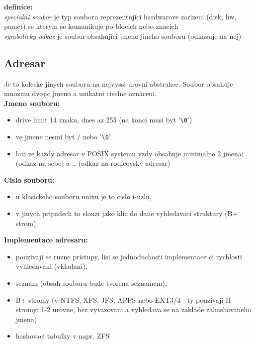 \documentclass[a4paper, 11pt]{article}
\begin{document}
\textbf{definice:} \\[0.5em]
\textit{specialni soubor} je typ souboru reprezentujici hardwarove zarizeni (disk, hw, pamet) se kterym se komunikuje po blocich nebo znacich \\[0.2em]
\textit{symbolicky odkaz} je soubor obsahujici jmeno jineho souboru (odkazuje na nej) \\

\newpage

\subsection{Adresar}
Je to kolecke jinych souboru na nejvyssi urovni abstrakce. Soubor obsahuje mnozinu dvojic jmeno a unikatni ciselne oznaceni. \\

\textbf{Jmeno souboru:}
\begin{itemize}
    \item drive limit 14 znaku, dnes az 255 (na konci musi byt '\verb|\0|')
    \item ve jmene nesmi byt / nebo '\verb|\0|' \\
    \item lati ze kazdy adresar v POSIX systemu vzdy obsahuje minimalne 2 jmena: . (odkaz na sebe) a .. (odkaz na rodicovsky adresar)
\end{itemize}

\textbf{Cislo souboru:}
\begin{itemize}
    \item u klasickeho souboru unixu je to cislo i-uzlu,
    \item v jinych pripadech to slouzi jako klic do dane vyhledavaci struktury (B+ strom)
\end{itemize}

\textbf{Implementace adresaru:}
\begin{itemize}
    \item pouzivaji se ruzne pristupy, lisi se jednoduchosti implementace ci rychlosti vyhledavani (vkladani),
    \item seznam (obsah souboru bude tvorena seznamem),
    \item B+ stromy (v NTFS, XFS, JFS, APFS nebo EXT3/4 - ty pouzivaji H-stromy: 1-2 urovne, bez vyvazovani a vyhledava se na zaklade zahashovaneho jmena)
    \item hashovaci tabulky v napr. ZFS \\
\end{itemize}
\end{document}
